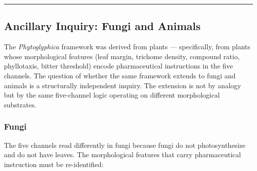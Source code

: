 \documentclass[12pt,a4paper]{article}
\begin{document}
\begin{center}\rule{0.5\linewidth}{0.5pt}\end{center}

\hypertarget{ancillary-inquiry-fungi-and-animals}{%
\subsection{Ancillary Inquiry: Fungi and
Animals}\label{ancillary-inquiry-fungi-and-animals}}

The \emph{Phytoglyphica} framework was derived from plants ---
specifically, from plants whose morphological features (leaf margin,
trichome density, compound ratio, phyllotaxis, bitter threshold) encode
pharmaceutical instructions in the five channels. The question of
whether the same framework extends to fungi and animals is a
structurally independent inquiry. The extension is not by analogy but by
the same five-channel logic operating on different morphological
substrates.

\hypertarget{fungi}{%
\subsubsection{Fungi}\label{fungi}}

The five channels read differently in fungi because fungi do not
photosynthesize and do not have leaves. The morphological features that
carry pharmaceutical instruction must be re-identified:
\end{document}
